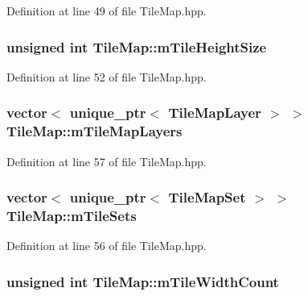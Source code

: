 Definition at line 49 of file Tile\-Map.\-hpp.

\hypertarget{class_tile_map_a74b8c66dd13864f60cea068a8872499d}{
\subsubsection[{m\-Tile\-Height\-Size}]{\setlength{\rightskip}{0pt plus 5cm}unsigned int Tile\-Map\-::m\-Tile\-Height\-Size\hspace{0.3cm}{\ttfamily [protected]}}}\label{class_tile_map_a74b8c66dd13864f60cea068a8872499d}


Definition at line 52 of file Tile\-Map.\-hpp.

\hypertarget{class_tile_map_a954cc80053d31eab8a7950a36793f7b6}{
\subsubsection[{m\-Tile\-Map\-Layers}]{\setlength{\rightskip}{0pt plus 5cm}vector$<$ unique\-\_\-ptr$<$ {\bf Tile\-Map\-Layer} $>$ $>$ Tile\-Map\-::m\-Tile\-Map\-Layers\hspace{0.3cm}{\ttfamily [protected]}}}\label{class_tile_map_a954cc80053d31eab8a7950a36793f7b6}


Definition at line 57 of file Tile\-Map.\-hpp.

\hypertarget{class_tile_map_ae9003055f192d71c5b5f9032852214a2}{
\subsubsection[{m\-Tile\-Sets}]{\setlength{\rightskip}{0pt plus 5cm}vector$<$ unique\-\_\-ptr$<$ {\bf Tile\-Map\-Set} $>$ $>$ Tile\-Map\-::m\-Tile\-Sets\hspace{0.3cm}{\ttfamily [protected]}}}\label{class_tile_map_ae9003055f192d71c5b5f9032852214a2}


Definition at line 56 of file Tile\-Map.\-hpp.

\hypertarget{class_tile_map_aaee5f34ef457d19fa32768301ac81fc2}{
\subsubsection[{m\-Tile\-Width\-Count}]{\setlength{\rightskip}{0pt plus 5cm}unsigned int Tile\-Map\-::m\-Tile\-Width\-Count\hspace{0.3cm}{\ttfamily [protected]}}}\label{class_tile_map_aaee5f34ef457d19fa32768301ac81fc2}


